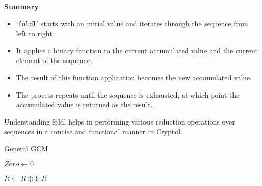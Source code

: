 \textbf{Summary}
\begin{itemize}
	\item `\texttt{foldl}' starts with an initial value and iterates through the sequence from left to right.
	\item It applies a binary function to the current accumulated value and the current element of the sequence.
	\item The result of this function application becomes the new accumulated value.
	\item The process repeats until the sequence is exhausted, at which point the accumulated value is returned as the result.
\end{itemize}
Understanding foldl helps in performing various reduction operations over sequences in a concise and functional manner in Cryptol.

\begin{algorithm}[H]
	\small
	\caption{General GCM}\label{alg:general_ghash}
	$Zero \gets 0$\;

	
	$R \gets R \oplus Y$\;
	\Return $R$\;
\end{algorithm}
